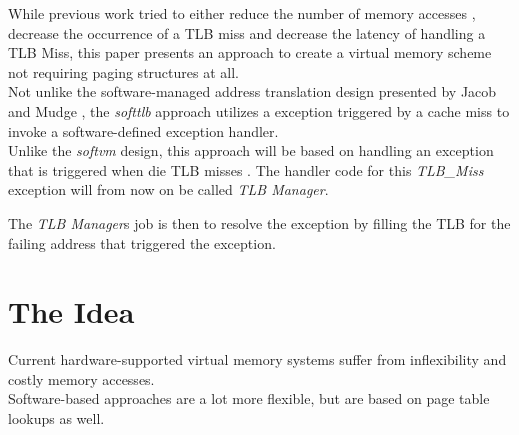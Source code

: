 




While previous work tried to either reduce the number of memory accesses ,
decrease the occurrence of a TLB miss and decrease the latency of handling a TLB Miss, this paper
presents an approach to create a virtual memory scheme not requiring paging structures at all.\\

Not unlike the software-managed address translation design presented by Jacob and Mudge \cite{jacobSoftwaremanagedAddressTranslation1997},
the \textit{softtlb} approach utilizes a exception triggered by a cache miss to invoke a software-defined
exception handler.\\
Unlike the \textit{softvm} design, this approach will be based on handling an exception that is triggered
when die TLB misses .
The handler code for this \textit{TLB\_Miss} exception will from now on be called \textit{TLB Manager}.

The \textit{TLB Manager}s job is then to resolve the exception by filling the TLB for the failing address
that triggered the exception.


\section{The Idea}


Current hardware-supported virtual memory systems suffer from inflexibility and costly memory accesses.\\
Software-based approaches are a lot more flexible, but are based on page table lookups as well.


